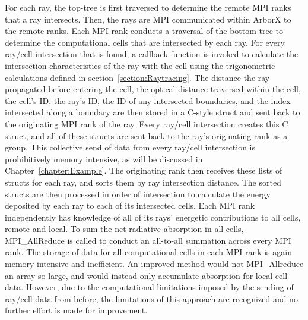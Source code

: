 For each ray, the top-tree is first traversed to determine the remote MPI ranks that a ray intersects.  Then, the rays are MPI communicated within ArborX to the remote ranks. Each MPI rank conducts a traversal of the bottom-tree to determine the computational cells that are intersected by each ray. For every ray/cell intersection that is found, a callback function is invoked to calculate the intersection characteristics of the ray with the cell using the trigonometric calculations defined in section~\ref{section:Raytracing}. The distance the ray propagated before entering the cell, the optical distance traversed within the cell, the cell's ID, the ray's ID, the ID of any intersected boundaries, and the index intersected along a boundary are then stored in a C-style struct and sent back to the originating MPI rank of the ray.
Every ray/cell intersection creates this C struct, and all of these structs are sent back to the ray's originating rank as a group. This collective send of data from every ray/cell intersection is prohibitively memory intensive, as will be discussed in Chapter~\ref{chapter:Example}. The originating rank then receives these lists of structs for each ray, and sorts them by ray intersection distance. The sorted structs are then processed in order of intersection to calculate the energy deposited by each ray to each of its intersected cells. Each MPI rank independently has knowledge of all of its rays' energetic contributions to all cells, remote and local. To sum the net radiative absorption in all cells, MPI\_AllReduce is called to conduct an all-to-all summation across every MPI rank. The storage of data for all computational cells in each MPI rank is again memory-intensive and inefficient. An improved method would not MPI\_Allreduce an array so large, and would instead only accumulate absorption for local cell data. However, due to the computational limitations imposed by the sending of ray/cell data from before, the limitations of this approach are recognized and no further effort is made for improvement.


